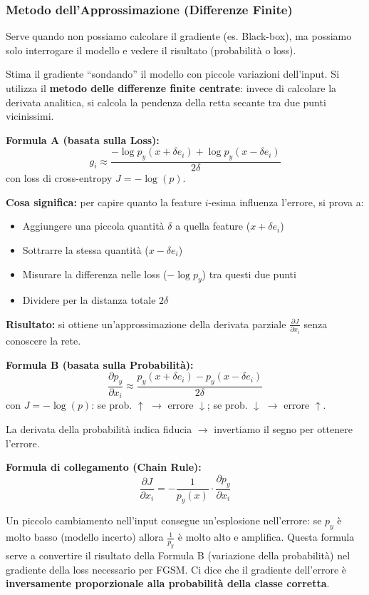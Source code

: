\subsubsection{Metodo dell'Approssimazione
            (Differenze Finite)}

Serve quando non possiamo calcolare il gradiente
(es. Black-box), ma possiamo solo interrogare il modello
e vedere il risultato (probabilità o loss).

Stima il gradiente ``sondando'' il modello con piccole
variazioni dell'input. Si utilizza il
\textbf{metodo delle differenze finite centrate}:
invece di calcolare la derivata analitica, si calcola la
pendenza della retta secante tra due punti vicinissimi.

\textbf{Formula A (basata sulla Loss):}
\[
    g_i \approx
    \frac{
        -\log p_y(x + \delta e_i)
        + \log p_y(x - \delta e_i)
    }{2\delta}
\]
con loss di cross-entropy $J = -\log(p)$.

\textbf{Cosa significa:} per capire quanto la feature $i$-esima
influenza l'errore, si prova a:
\begin{itemize}
    \item Aggiungere una piccola quantità $\delta$ a quella
          feature ($x + \delta e_i$)
    \item Sottrarre la stessa quantità ($x - \delta e_i$)
    \item Misurare la differenza nelle loss ($-\log p_y$) tra
          questi due punti
    \item Dividere per la distanza totale $2\delta$
\end{itemize}

\textbf{Risultato:} si ottiene un'approssimazione della
derivata parziale $\frac{\partial J}{\partial x_i}$ senza
conoscere la rete.

\textbf{Formula B (basata sulla Probabilità):}
\[
    \frac{\partial p_y}{\partial x_i}
    \approx
    \frac{
        p_y(x + \delta e_i) - p_y(x - \delta e_i)
    }{2\delta}
\]
con $J = -\log(p)$: se prob. $\uparrow$ $\rightarrow$ errore
$\downarrow$; se prob. $\downarrow$ $\rightarrow$ errore
$\uparrow$.

La derivata della probabilità indica fiducia $\rightarrow$
invertiamo il segno per ottenere l'errore.

\textbf{Formula di collegamento (Chain Rule):}
\[
    \frac{\partial J}{\partial x_i}
    = -\frac{1}{p_y(x)} \cdot
    \frac{\partial p_y}{\partial x_i}
\]

Un piccolo cambiamento nell'input consegue un'esplosione
nell'errore: se $p_y$ è molto basso (modello incerto) allora
$\frac{1}{p_y}$ è molto alto e amplifica. Questa formula serve
a convertire il risultato della Formula B (variazione della
probabilità) nel gradiente della loss necessario per FGSM.
Ci dice che il gradiente dell'errore è
\textbf{inversamente proporzionale alla probabilità della
classe corretta}.

